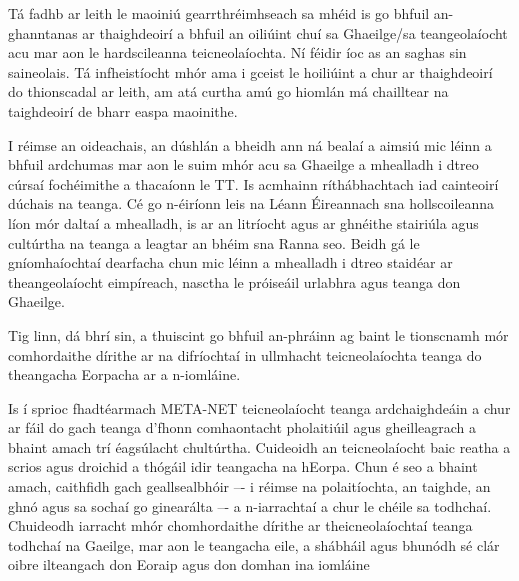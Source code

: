 \begin{multicols}{2}
Tá fadhb ar leith le maoiniú gearrthréimhseach sa mhéid is go bhfuil an-ghanntanas ar thaighdeoirí a bhfuil an oiliúint chuí sa Ghaeilge/sa teangeolaíocht acu mar aon le hardscileanna teicneolaíochta. Ní féidir íoc as an saghas sin saineolais. Tá infheistíocht mhór ama i gceist le hoiliúint a chur ar thaighdeoirí do thionscadal ar leith, am atá curtha amú go hiomlán má chailltear na taighdeoirí de bharr easpa maoinithe.

I réimse an oideachais, an dúshlán a bheidh ann ná bealaí a aimsiú mic léinn a bhfuil ardchumas mar aon le suim mhór acu sa Ghaeilge a mhealladh i dtreo cúrsaí fochéimithe a thacaíonn le TT. Is acmhainn ríthábhachtach iad cainteoirí dúchais na teanga. Cé go n-éiríonn leis na Léann Éireannach sna hollscoileanna líon mór daltaí a mhealladh, is ar an litríocht agus ar ghnéithe stairiúla agus cultúrtha na teanga a leagtar an bhéim sna Ranna seo. Beidh gá le gníomhaíochtaí dearfacha chun mic léinn a mhealladh i dtreo staidéar ar theangeolaíocht eimpíreach, nasctha le próiseáil urlabhra agus teanga don Ghaeilge.


Tig linn, dá bhrí sin, a thuiscint go bhfuil an-phráinn ag baint le tionscnamh mór comhordaithe dírithe ar na difríochtaí in ullmhacht teicneolaíochta teanga do theangacha Eorpacha ar a n-iomláine.

Is í sprioc fhadtéarmach META-NET teicneolaíocht teanga ardchaighdeáin a chur ar fáil do gach teanga d’fhonn comhaontacht pholaitiúil agus gheilleagrach a bhaint amach trí éagsúlacht chultúrtha. Cuideoidh an teicneolaíocht  baic reatha a scrios agus droichid a thógáil idir teangacha na hEorpa. Chun é seo a bhaint amach, caithfidh gach geallsealbhóir –- i réimse na polaitíochta, an taighde, an ghnó agus sa sochaí go ginearálta –- a n-iarrachtaí a chur le chéile sa todhchaí. Chuideodh iarracht mhór chomhordaithe dírithe ar theicneolaíochtaí teanga todhchaí na Gaeilge, mar aon le teangacha eile, a shábháil agus bhunódh sé clár oibre ilteangach don Eoraip agus don domhan ina iomláine \cite{tcstar} 
 
\end{multicols}

\cleardoublepage




